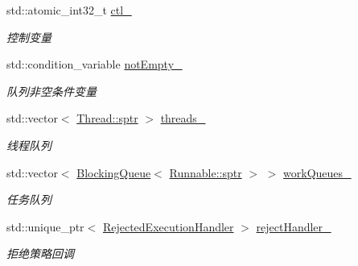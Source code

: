 \begin{DoxyCompactItemize}
\mbox{\label{classThreadPoolExecutor_a010113b7aac17ef364d417c485263873}} 
std\+::atomic\+\_\+int32\+\_\+t \hyperlink{classThreadPoolExecutor_a010113b7aac17ef364d417c485263873}{ctl\+\_\+}
\begin{DoxyCompactList}\small\item\em 控制变量 \end{DoxyCompactList}\item 
\mbox{\label{classThreadPoolExecutor_ad523af8548ca8f1dae80cb295ee567b3}} 
std\+::condition\+\_\+variable \hyperlink{classThreadPoolExecutor_ad523af8548ca8f1dae80cb295ee567b3}{not\+Empty\+\_\+}
\begin{DoxyCompactList}\small\item\em 队列非空条件变量 \end{DoxyCompactList}\item 
\mbox{\label{classThreadPoolExecutor_a47dd74330fa41d01067943b1db74818a}} 
std\+::vector$<$ \hyperlink{classThread_a430059e402325caaf1ed185fb520c9d2}{Thread\+::sptr} $>$ \hyperlink{classThreadPoolExecutor_a47dd74330fa41d01067943b1db74818a}{threads\+\_\+}
\begin{DoxyCompactList}\small\item\em 线程队列 \end{DoxyCompactList}\item 
\mbox{\label{classThreadPoolExecutor_a415491f8f40c0fcb99e7ec25cdd209d0}} 
std\+::vector$<$ \hyperlink{classBlockingQueue}{Blocking\+Queue}$<$ \hyperlink{classRunnable_abe8d3066c7305401d6f0aad8e70780f2}{Runnable\+::sptr} $>$ $>$ \hyperlink{classThreadPoolExecutor_a415491f8f40c0fcb99e7ec25cdd209d0}{work\+Queues\+\_\+}
\begin{DoxyCompactList}\small\item\em 任务队列 \end{DoxyCompactList}\item 
\mbox{\label{classThreadPoolExecutor_a347041db412b03aa09dd4e9b3beaa391}} 
std\+::unique\+\_\+ptr$<$ \hyperlink{classRejectedExecutionHandler}{Rejected\+Execution\+Handler} $>$ \hyperlink{classThreadPoolExecutor_a347041db412b03aa09dd4e9b3beaa391}{reject\+Handler\+\_\+}
\begin{DoxyCompactList}\small\item\em 拒绝策略回调 \end{DoxyCompactList}\end{DoxyCompactItemize}


